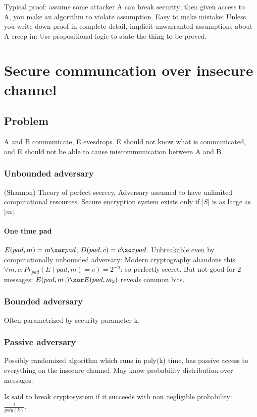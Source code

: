 \documentclass[oneside, article]{memoir}
\begin{document}
Typical proof: assume some attacker A can break security; then given access to A, you make an algorithm to violate assumption. Easy to make mistake: Unless you write down proof in complete detail, implicit unwarranted assumptions about A creep in: Use propositional logic to state the thing to be proved.

\chapter{Secure communcation over insecure channel}
\section{Problem}
A and B communicate, E evesdrops. E should not know what is communicated, and E should not be able to cause miscommunication between A and B.

\subsection{Unbounded adversary}
(Shannon) Theory of perfect secrecy. Adversary assumed to have unlimited computational resources. Secure encryption system exists only if $|S|$ is as large as $|m|$.

\subsubsection{One time pad}
$E(pad, m) = m \xor pad$; $D(pad, c) = c \xor pad$. Unbreakable even by computationally unbounded adversary: Modern cryptography abandons this. $\forall m, c: Pr_{pad}(E(pad, m) = c) = 2^{-n}$: so perfectly secret. But not good for 2 messages: $E(pad, m_1) \xor E(pad, m_2)$ reveals common bits.

\subsection{Bounded adversary}
Often parametrized by security parameter k.

\subsection{Passive adversary}
Possibly randomized algorithm which runs in poly(k) time, has passive access to everything on the insecure channel. May know probability distribution over messages.

Is said to break cryptosystem if it succeeds with non negligible probability: $\frac{1}{poly(k)}$.
\end{document}
